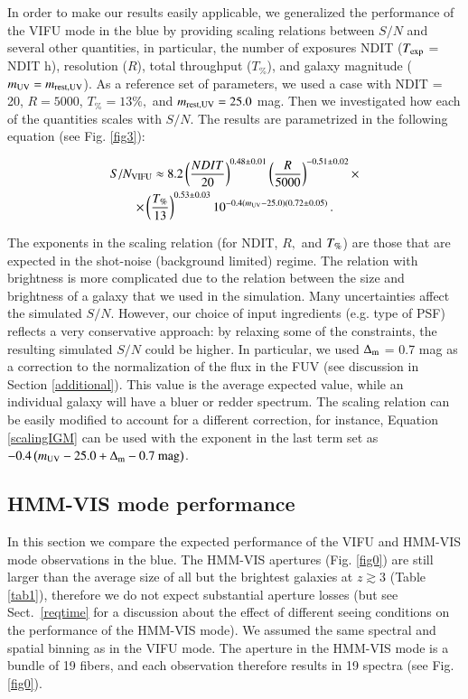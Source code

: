 \documentclass{aa}
\begin{document}
In order to make our results easily applicable, we generalized the performance of the VIFU mode in the blue by providing scaling relations between $S/N$ and several other quantities, in particular, the number of exposures NDIT ($T_{\rm exp}$ = NDIT h), resolution ($R$), total throughput ($T_{\%}$), and galaxy magnitude ($m_{\rm UV} = m_{\rm rest,UV}$). As a reference set of parameters, we used a case with NDIT = 20, $R = 5000$, $T_{\%}=13 \%,$ and $m_{\rm rest,UV} = 25.0$ mag. Then we investigated how each of the quantities scales with $S/N$. The results are parametrized in the following equation (see Fig. \ref{fig3}):

\begin{multline}
\label{scalingIGM}
S/N_{\rm VIFU} \approx 8.2\left(\frac{NDIT}{20}\right)^{0.48\pm 0.01}\left(\frac{R}{5000} \right)^{-0.51 \pm 0.02}\times \\ \times\left( \frac{T_{\%}}{13}\right)^{0.53\pm0.03}10^{-0.4(m_{\rm UV} - 25.0)(0.72 \pm 0.05)}\,.
\end{multline}

\noindent The exponents in the scaling relation (for NDIT, $R,$ and $T_{\rm \%}$) are those that are expected in the shot-noise (background limited) regime. The relation with brightness is more complicated due to the relation between the size and brightness of a galaxy that we used in the simulation. Many uncertainties affect the simulated $S/N$. However, our choice of input ingredients (e.g. type of PSF) reflects a very conservative approach: by relaxing some of the constraints, the resulting simulated $S/N$ could be higher. In particular, we used $\Delta_{\rm m}$ = 0.7 mag as a correction to the normalization of the flux in the FUV (see discussion in Section \ref{additional}). This value is the average expected value, while an individual galaxy will have a bluer or redder spectrum. The scaling relation can be easily modified to account for a different correction, for instance, Equation \ref{scalingIGM} can be used with the exponent in the last term set as $-0.4\left( m_{\rm UV} - 25.0 + \Delta_{\rm m} - 0.7~\mathrm{mag}\right)$.

\subsection{HMM-VIS mode performance}
\label{hmmvis}

In this section we compare the expected performance of the VIFU and HMM-VIS mode observations in the blue. The HMM-VIS apertures (Fig. \ref{fig0}) are still larger than the average size of all but the brightest galaxies at $z \gtrsim 3$ (Table \ref{tab1}), therefore we do not expect substantial aperture losses (but see Sect.~\ref{reqtime} for a discussion about the effect of different seeing conditions on the performance of the HMM-VIS mode). We assumed the same spectral and spatial binning as in the VIFU mode. The aperture in the HMM-VIS mode is a bundle of 19 fibers, and each observation therefore results in 19 spectra (see Fig. \ref{fig0}).
\end{document}
